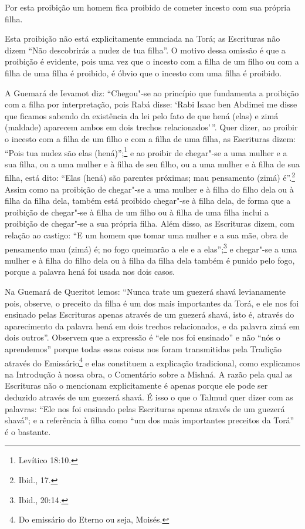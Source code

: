 \begin{multicols}{2}
Por esta proibição um homem fica proibido de cometer incesto com sua
própria filha.

Esta proibição não está explicitamente enunciada na Torá\starr; as
Escrituras não dizem ``Não descobrirás a nudez de tua filha''. O motivo
dessa omissão é que a proibição é evidente, pois uma vez que o incesto
com a filha de um filho ou com a filha de uma filha é proibido, é óbvio
que o incesto com uma filha é proibido.

A Guemará\starr{} de Ievamot\starr{} diz: ``Chegou"-se ao princípio que fundamenta a
proibição com a filha por interpretação, pois Rabá\starr{} disse: `Rabi Isaac
ben Abdimei\starr{} me disse que ficamos sabendo da existência da lei pelo fato
de que hená\starr{} (elas) e zimá\starr{} (maldade) aparecem ambos em dois
trechos relacionados'\,''. Quer dizer, ao proibir o incesto com a filha de
um filho e com a filha de uma filha, as Escrituras dizem: ``Pois tua
nudez são elas (hená\starr{})'';\footnote{Levítico 18:10.} e ao proibir de chegar"-se a
uma mulher e a sua filha, ou a uma mulher e à filha de seu filho, ou a
uma mulher e à filha de sua filha, está dito: ``Elas (hená\starr{}) são parentes
próximas; mau pensamento (zimá\starr) é''.\footnote{Ibid., 17.} Assim como na proibição
de chegar"-se a uma mulher e à filha do filho dela ou à filha da filha
dela, também está proibido chegar"-se à filha dela, de forma que a
proibição de chegar"-se à filha de um filho ou à filha de uma filha
inclui a proibição de chegar"-se a sua própria filha. Além disso, as
Escrituras dizem, com relação ao castigo: ``E um homem que tomar uma
mulher e a sua mãe, obra de pensamento mau (zimá\starr) é; no fogo queimarão a
ele e a elas'';\footnote{Ibid., 20:14.} e chegar"-se a uma mulher e à filha do
filho dela ou à filha da filha dela também é punido pelo fogo, porque a
palavra hená\starr{} foi usada nos dois casos.

Na Guemará\starr{} de Queritot\starr{} lemos: ``Nunca trate um guezerá shavá\starr{}
levianamente pois, observe, o preceito da filha é um dos mais
importantes da Torá\starr, e ele nos foi ensinado pelas Escrituras apenas
através de um guezerá shavá\starr, isto é, através do aparecimento da
palavra hená\starr{} em dois trechos relacionados, e da palavra zimá\starr{} em dois
outros''. Observem que a expressão é ``ele nos foi ensinado'' e não
``nós o aprendemos'' porque todas essas coisas nos foram transmitidas
pela Tradição através do Emissário\footnote{Do emissário do Eterno ou seja, Moisés.} e elas constituem a explicação tradicional, como explicamos na Introdução à
nossa obra, o Comentário sobre a Mishná\starr. A razão pela qual as
Escrituras não o mencionam explicitamente é apenas porque ele pode ser
deduzido através de um guezerá shavá\starr. É isso o que o Talmud\starr{} quer
dizer com as palavras: ``Ele nos foi ensinado pelas Escrituras apenas
através de um guezerá shavá\starr''; e a referência à filha como ``um dos
mais importantes preceitos da Torá\starr'' é o bastante.


\end{multicols}
